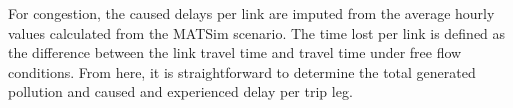 For congestion, the caused delays per link are imputed from the average hourly values calculated from the MATSim scenario.
The time lost per link is defined as the difference between the link travel time and travel time under free flow conditions.
From here, it is straightforward to determine the total generated pollution and caused and experienced delay per trip leg.

